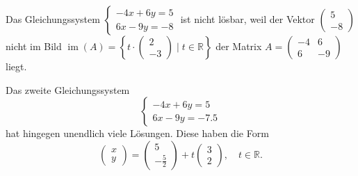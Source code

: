 \begin{bsp}
{}{}
Das Gleichungssystem $\begin{cases}
-4x + 6y = 5 \\
6x - 9y = -8
\end{cases}$ ist nicht lösbar, weil der Vektor \( \begin{pmatrix} 5 \\ -8 \end{pmatrix} \) nicht  im Bild $\operatorname{im}(A) = \left\{ t\cdot \begin{pmatrix}
    2\\-3 
\end{pmatrix} \mid t \in \mathbb{R} \right\}$ der Matrix $A=\begin{pmatrix}
-4 & 6 \\ 6 & -9 \end{pmatrix}$ liegt.

\end{bsp}



Das zweite Gleichungssystem
\[\begin{cases}
-4x + 6y = 5 \\
6x - 9y = -7.5
\end{cases}\]
hat hingegen unendlich viele Lösungen. Diese haben die Form
\[ \begin{pmatrix}
x \\ y \end{pmatrix} = \begin{pmatrix}
    5 \\ -\frac{5}{2}
\end{pmatrix} + t \begin{pmatrix} 3 \\ 2 \end{pmatrix}, \quad t \in \mathbb{R}.\]








































